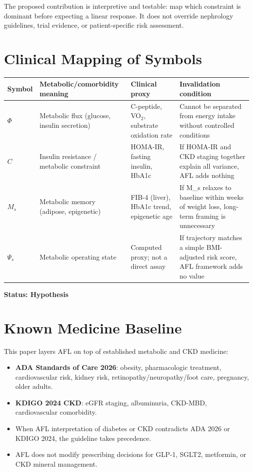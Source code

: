\documentclass[12pt,a4paper]{article}
\begin{document}
The proposed contribution is interpretive and testable: map which constraint is dominant before expecting a linear response. It does not override nephrology guidelines, trial evidence, or patient-specific risk assessment.

\section{Clinical Mapping of Symbols}

\begin{center}
\begin{tabular}{p{1.5cm}p{3.0cm}p{3.5cm}p{4.5cm}}
\toprule
Symbol & Metabolic/comorbidity meaning & Clinical proxy & Invalidation condition \\
\midrule
$\Phi$ & Metabolic flux (glucose, insulin secretion) & C-peptide, VO$_2$, substrate oxidation rate & Cannot be separated from energy intake without controlled conditions \\
$C$ & Insulin resistance / metabolic constraint & HOMA-IR, fasting insulin, HbA1c & If HOMA-IR and CKD staging together explain all variance, AFL adds nothing \\
$M_s$ & Metabolic memory (adipose, epigenetic) & FIB-4 (liver), HbA1c trend, epigenetic age & If M\_s relaxes to baseline within weeks of weight loss, long-term framing is unnecessary \\
$\Psi_s$ & Metabolic operating state & Computed proxy; not a direct assay & If trajectory matches a simple BMI-adjusted risk score, AFL framework adds no value \\
\bottomrule
\end{tabular}
\end{center}

\textbf{Status: Hypothesis}

\section{Known Medicine Baseline}

This paper layers AFL on top of established metabolic and CKD medicine:
\begin{itemize}
    \item \textbf{ADA Standards of Care 2026}: obesity, pharmacologic treatment, cardiovascular risk, kidney risk, retinopathy/neuropathy/foot care, pregnancy, older adults.
    \item \textbf{KDIGO 2024 CKD}: eGFR staging, albuminuria, CKD-MBD, cardiovascular comorbidity.
    \item When AFL interpretation of diabetes or CKD contradicts ADA 2026 or KDIGO 2024, the guideline takes precedence.
    \item AFL does not modify prescribing decisions for GLP-1, SGLT2, metformin, or CKD mineral management.
\end{itemize}
\end{document}
